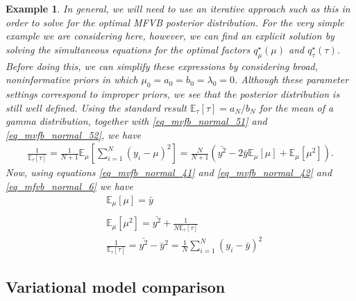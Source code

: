 \documentclass[10pt ]{article}
\newtheorem{example}{Example}
\begin{document}
\begin{example}
{In general, we will need to use an iterative approach such as this in order to solve for the optimal MFVB posterior distribution. For the very simple example we are considering here, however, we can find an explicit solution by solving the simultaneous equations for the optimal factors $q^{\star}_{\mu} (\mu)$ and $q^{\star}_{\tau} (\tau)$. Before doing this, we can simplify these expressions by considering broad, noninformative priors in which $\mu_0 = a_0 = b_0 = \lambda_0 = 0$. Although these parameter settings correspond to improper priors, we see that the posterior distribution is still well defined. Using the standard result $\mathbb{E}_{\tau} [\tau] = a_N / b_N$ for the mean of a gamma distribution, together with \eqref{eq_mvfb_normal_51} and \eqref{eq_mvfb_normal_52}, we have
\begin{align}
\frac{1}{\mathbb{E}_{\tau} [\tau]} = \frac{1}{N+1} \mathbb{E}_{\mu} \left[ \sum_{i=1}^N (y_i -\mu)^2 \right] =  \frac{N}{N+1} \left( \bar{y^2}- 2 \bar{y}\mathbb{E}_{\mu} \left[\mu \right] +  \mathbb{E}_{\mu} \left[\mu^2 \right] \right).
\label{eq_mfvb_normal_6}
\end{align}
Now, using equations \eqref{eq_mvfb_normal_41} and \eqref{eq_mvfb_normal_42} and \eqref{eq_mfvb_normal_6} we have
\begin{align}
&\mathbb{E}_{\mu} \left[ \mu \right] = \bar{y} \\
\label{eq_mfvb_normal_71}
\\
&\mathbb{E}_{\mu} \left[ \mu^2 \right] = \bar{y^2} + \frac{1}{N \mathbb{E}_{\tau} \left[ \tau \right]} 
\label{eq_mfvb_normal_72}
\\
&\frac{1}{\mathbb{E}_{\tau} \left[ \tau \right]} = \bar{y^2} -\bar{y}^2 = \frac{1}{N} \sum_{i=1}^N (y_i - \bar{y})^2
\end{align}

}
\label{example_gauddian}
\end{example}

\subsection{Variational model comparison}
\end{document}
